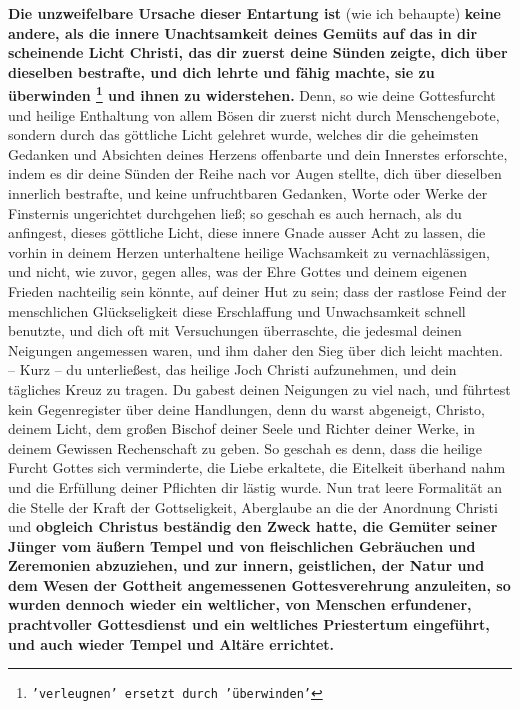 \label{ref:02_08_ursache_des_abfalls}
\textbf{Die unzweifelbare Ursache dieser Entartung ist} (wie ich behaupte)
\textbf{keine andere,
als die innere Unachtsamkeit deines Gemüts auf das in dir scheinende Licht
Christi, das dir zuerst deine Sünden zeigte, dich über dieselben bestrafte, und
dich lehrte und fähig machte, sie zu überwinden
\footnote{\texttt{'verleugnen' ersetzt durch 'überwinden'}}
und ihnen zu widerstehen.} Denn,
so wie deine Gottesfurcht und heilige Enthaltung von allem Bösen dir zuerst
nicht durch Menschengebote, sondern durch das göttliche Licht gelehret wurde,
welches dir die geheimsten Gedanken und Absichten deines Herzens offenbarte und
dein Innerstes erforschte, indem es dir deine Sünden der Reihe nach vor Augen
stellte, dich über dieselben innerlich bestrafte, und keine unfruchtbaren
Gedanken, Worte oder Werke der Finsternis ungerichtet durchgehen ließ; so
geschah es auch hernach, als du anfingest, dieses göttliche Licht, diese innere
Gnade ausser Acht zu lassen, die vorhin in deinem Herzen unterhaltene heilige
Wachsamkeit zu vernachlässigen, und nicht, wie zuvor, gegen alles, was der Ehre
Gottes und deinem eigenen Frieden nachteilig sein könnte, auf deiner Hut zu
sein; dass der rastlose Feind der menschlichen Glückseligkeit diese
Erschlaffung und Unwachsamkeit schnell benutzte, und dich oft mit Versuchungen
überraschte, die jedesmal deinen Neigungen angemessen waren, und ihm daher den
Sieg über dich leicht machten. -- Kurz -- du unterließest, das heilige Joch
Christi aufzunehmen, und dein tägliches Kreuz zu tragen. Du gabest deinen
Neigungen zu viel nach, und führtest kein Gegenregister über deine Handlungen,
denn du warst abgeneigt, Christo, deinem Licht, dem großen Bischof deiner
Seele und Richter deiner Werke, in deinem Gewissen Rechenschaft zu geben. So
geschah es denn, dass die heilige Furcht Gottes sich verminderte, die Liebe
erkaltete, die Eitelkeit überhand nahm und die Erfüllung deiner Pflichten dir
lästig wurde. Nun trat leere Formalität an die Stelle der Kraft der
Gottseligkeit, Aberglaube an die der Anordnung Christi und
\label{ref:02_08_falscher_gottesdienst} \textbf{obgleich Christus
beständig den Zweck hatte, die Gemüter seiner Jünger vom äußern Tempel und von
fleischlichen Gebräuchen und Zeremonien abzuziehen, und zur innern, geistlichen,
der Natur und dem Wesen der Gottheit angemessenen Gottesverehrung anzuleiten, so
wurden dennoch wieder ein weltlicher, von Menschen erfundener, prachtvoller
Gottesdienst  und ein weltliches Priestertum
 eingeführt, und auch wieder Tempel 
und Altäre errichtet.}
